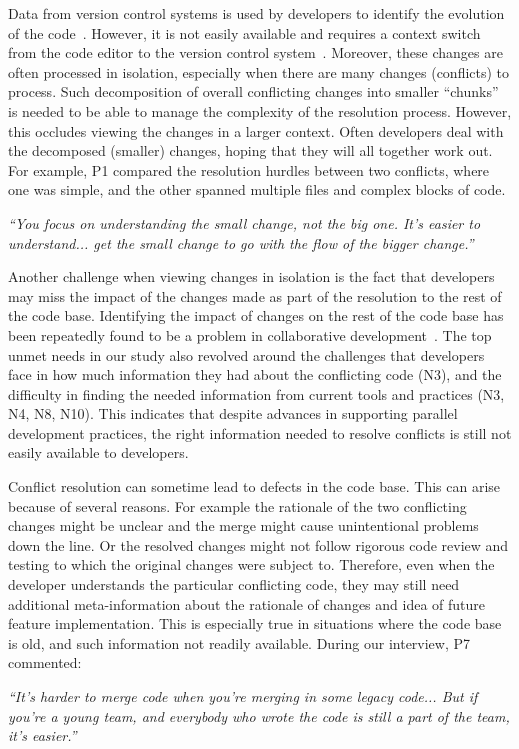 Data from version control systems is used by developers to identify the evolution of the code~\cite{Mihai_lenses}.
However, it is not easily available and requires a context switch from the code editor to the version control system~\cite{Guzzi2015}. 
Moreover, these changes are often processed in isolation, especially when there are many changes (conflicts) to process. 
Such decomposition of overall conflicting changes into smaller ``chunks'' is needed to be able to manage the complexity of the resolution process.
However, this occludes viewing the changes in a larger context. 
Often developers deal with the decomposed (smaller) changes, hoping that they will all together work out. 
For example, P1 compared the resolution hurdles between two conflicts, where one was simple, and the other spanned multiple files and complex blocks of code.
\begin{quoting}
\textit{``You focus on understanding the small change, not the big one. It's easier to understand... get the small change to go with the flow of the bigger change.''}
\end{quoting}

Another challenge when viewing changes in isolation is the fact that developers may miss the impact of the changes made as part of the resolution to the rest of the code base. 
Identifying the impact of changes on the rest of the code base has been repeatedly found to be a problem in collaborative development~\cite{deSouza2008, Guzzi2015}. 
The top unmet needs in our study also revolved around the challenges that developers face in how much information they had about the conflicting code (N3), and the difficulty in finding the needed information from current tools and practices (N3, N4, N8, N10). 
This indicates that despite advances in supporting parallel development practices, the right information needed to resolve conflicts is still not easily available to developers. 

Conflict resolution can sometime lead to defects in the code base. 
This can arise because of several reasons. 
For example the rationale of the two conflicting changes might be unclear and the merge might cause unintentional problems down the line. 
Or the resolved changes might not follow rigorous code review and testing to which the original changes were subject to.
Therefore, even when the developer understands the particular conflicting code, they may still need additional meta-information about the rationale of changes and idea of future feature implementation. 
This is especially true in situations where the code base is old, and such information not readily available. During our interview, P7 commented:
\begin{quoting}
\textit{``It's harder to merge code when you're merging in some legacy code... But if you're a young team, and everybody who wrote the code is still a part of the team, it's easier.''}
\end{quoting}

